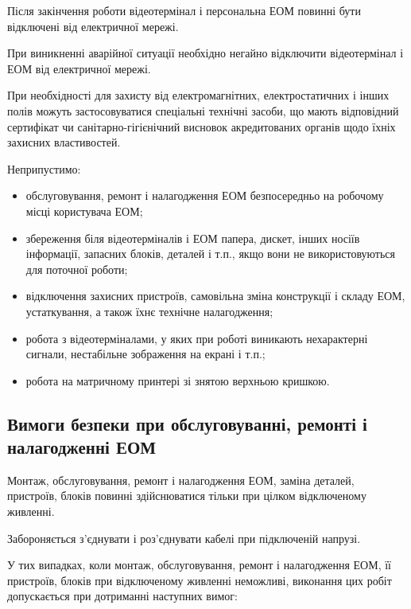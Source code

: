 \documentclass[simple,a4paper,14pt,ukrainian,utf8]{eskdtext}
\begin{document}
\begin{appendices}
                Після закінчення роботи відеотермінал і персональна ЕОМ повинні бути відключені від електричної мережі.

                При виникненні аварійної ситуації необхідно негайно відключити відеотермінал і ЕОМ від електричної мережі.

                При необхідності для захисту від електромагнітних, електростатичних і інших полів можуть застосовуватися спеціальні технічні засоби, що мають відповідний сертифікат чи санітарно-гігієнічний висновок акредитованих органів щодо їхніх захисних властивостей.

                Неприпустимо:

                \begin{itemize}
                    \item обслуговування, ремонт і налагодження ЕОМ безпосередньо на робочому місці користувача ЕОМ;
                    \item збереження біля відеотерміналів і ЕОМ папера, дискет, інших носіїв інформації, запасних блоків, деталей і т.п., якщо вони не використовуються для поточної роботи;
                    \item відключення захисних пристроїв, самовільна зміна конструкції і складу ЕОМ, устаткування, а також їхнє технічне налагодження;
                    \item робота з відеотерміналами, у яких при роботі виникають нехарактерні сигнали, нестабільне зображення на екрані і т.п.;
                    \item робота на матричному принтері зі знятою верхньою кришкою.
                \end{itemize}

            \subsection{Вимоги безпеки при обслуговуванні, ремонті і налагодженні ЕОМ}

                Монтаж, обслуговування, ремонт і налагодження ЕОМ, заміна деталей, пристроїв, блоків повинні здійснюватися тільки при цілком відключеному живленні.

                Забороняється з'єднувати і роз'єднувати кабелі при підключеній напрузі.

                У тих випадках, коли монтаж, обслуговування, ремонт і налагодження ЕОМ, її пристроїв, блоків при відключеному живленні неможливі, виконання цих робіт допускається при дотриманні наступних вимог:


\end{appendices}
\end{document}

